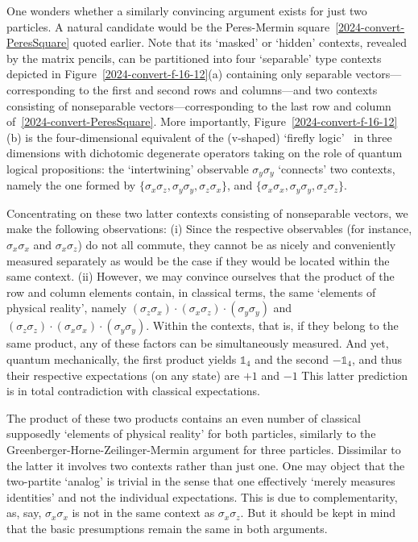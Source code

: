 \documentclass[
  twocolumn,
 showpacs,
 showkeys,
 preprintnumbers,
 amsmath,amssymb,
 aps,
 prl,
  longbibliography,
 floatfix,
 ]{revtex4-2}
\newcommand\myotimes{ }
\begin{document}
One wonders whether a similarly convincing argument exists for just two particles.
A natural candidate would be the Peres-Mermin square~\eqref{2024-convert-PeresSquare} quoted earlier.
Note that its `masked' or `hidden' contexts, revealed by the matrix pencils, can be partitioned into four `separable' type contexts
depicted in Figure~\ref{2024-convert-f-16-12}(a)
containing only separable vectors---corresponding to the first and second rows and columns---and two contexts consisting of nonseparable
vectors---corresponding to the last row and column of~\eqref{2024-convert-PeresSquare}.
More importantly, Figure~\ref{2024-convert-f-16-12}(b) is the four-dimensional equivalent
of the (v-shaped) `firefly logic'~\cite[pp. 21-22]{cohen} in three dimensions
with dichotomic degenerate operators taking on the role of quantum logical propositions:
the `intertwining' observable $\sigma_y \myotimes \sigma_y$ `connects' two contexts,
namely the one formed by
$\{ \sigma_x \myotimes \sigma_z , \sigma_y \myotimes \sigma_y , \sigma_z \myotimes \sigma_x\}$,
and
$\{ \sigma_x \myotimes \sigma_x, \sigma_y \myotimes \sigma_y, \sigma_z \myotimes \sigma_z\}$.



Concentrating on these two latter contexts consisting of nonseparable vectors, we make the following observations:
(i) Since the respective observables (for instance, $\sigma_x \myotimes \sigma_x$ and $\sigma_x \myotimes \sigma_z$)
do not all commute, they cannot be as nicely and conveniently measured separately as would be the case if they would be located within the same context.
(ii) However, we may convince ourselves that the product of the row and column elements contain,
in classical terms, the same `elements of physical reality', namely
$(\sigma_z \myotimes \sigma_x) \cdot (\sigma_x \myotimes \sigma_z) \cdot (\sigma_y \myotimes \sigma_y)$
and
$(\sigma_z \myotimes \sigma_z) \cdot (\sigma_x \myotimes \sigma_x) \cdot (\sigma_y \myotimes \sigma_y)$.
Within the contexts, that is, if they belong to the same product, any of these factors can be simultaneously measured.
And yet, quantum mechanically, the first product yields $\mathbb{1}_4$ and the second $-\mathbb{1}_4$,
and thus their respective expectations (on any state) are $+1$ and $-1$ This latter prediction is in total contradiction with classical expectations.

The product of these two products contains an even number of classical supposedly `elements of physical reality' for both particles,
similarly to the Greenberger-Horne-Zeilinger-Mermin argument for three particles.
Dissimilar to the latter  it involves two contexts rather than just one.
One may object that the two-partite `analog' is trivial in the sense that one effectively `merely measures identities' and not the individual expectations.
This is due to complementarity, as, say,  $\sigma_x \myotimes \sigma_x$ is not in the same context as $\sigma_x \myotimes \sigma_z$.
But it should be kept in mind that the basic presumptions remain the same in both arguments.
\end{document}
